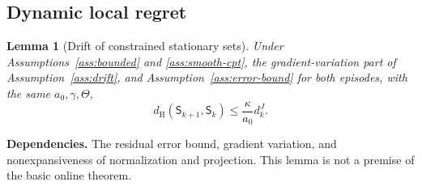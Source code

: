 \documentclass[11pt]{article}
\newtheorem{lemma}[theorem]{Lemma}
\newcommand{\1}{\mathbf 1}
\newcommand{\Sta}{\mathsf S}
\newcommand{\dH}{d_{\mathrm H}}
\theoremstyle{definition}
\newcommand{\dependson}[1]{\par\noindent\textbf{Dependencies.} #1\par\smallskip}
\begin{document}
\subsection{Dynamic local regret}
\begin{lemma}[Drift of constrained stationary sets]\label{lem:set-drift}
Under Assumptions~\ref{ass:bounded} and \ref{ass:smooth-cpt}, the gradient-variation part of Assumption~\ref{ass:drift}, and Assumption~\ref{ass:error-bound} for both episodes, with the same $a_0,\gamma,\Theta$,
\begin{equation}\label{eq:set-drift}
 \dH(\Sta_{k+1},\Sta_k)\le\frac{\kappa}{a_0}d_k^J.
\end{equation}
\end{lemma}
\dependson{The residual error bound, gradient variation, and nonexpansiveness of normalization and projection. This lemma is not a premise of the basic online theorem.}
\end{document}
